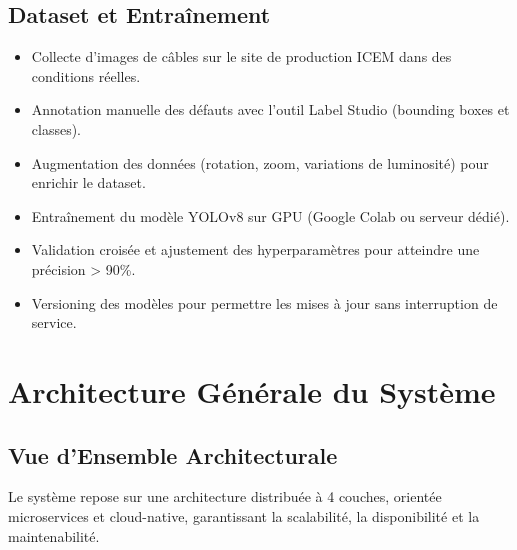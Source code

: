 \subsection{Dataset et Entraînement}

\begin{itemize}
    \item Collecte d'images de câbles sur le site de production ICEM dans des conditions réelles.
    \item Annotation manuelle des défauts avec l'outil Label Studio (bounding boxes et classes).
    \item Augmentation des données (rotation, zoom, variations de luminosité) pour enrichir le dataset.
    \item Entraînement du modèle YOLOv8 sur GPU (Google Colab ou serveur dédié).
    \item Validation croisée et ajustement des hyperparamètres pour atteindre une précision > 90\%.
    \item Versioning des modèles pour permettre les mises à jour sans interruption de service.
\end{itemize}

\section{Architecture Générale du Système}

\subsection{Vue d'Ensemble Architecturale}

Le système repose sur une architecture distribuée à 4 couches, orientée microservices et cloud-native, garantissant la scalabilité, la disponibilité et la maintenabilité.

